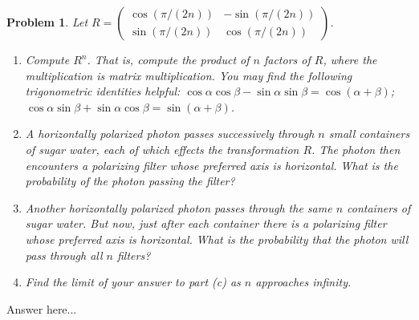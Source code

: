 \documentclass[12pt]{article}
\newenvironment{answer}
    {\begin{adjustwidth}{0pt}{0pt}}
    {\end{adjustwidth}}
\newtheorem{problem}{Problem}
\theoremstyle{remark}  %
\begin{document}
    \begin{problem}
        Let $R=\begin{pmatrix}
            \cos(\pi/(2n)) & -\sin(\pi/(2n)) \\
            \sin(\pi/(2n)) & \cos(\pi/(2n))
        \end{pmatrix}$.
        \begin{enumerate}[label=(\alph*)]
            \item Compute $R^n$. That is, compute the product of $n$ factors of $R$, where the multiplication is matrix multiplication. You may find the following trigonometric identities helpful: $\cos\alpha\cos\beta - \sin\alpha\sin\beta = \cos(\alpha + \beta)$; $\cos\alpha\sin\beta + \sin\alpha\cos\beta = \sin(\alpha + \beta)$.
            \item A horizontally polarized photon passes successively through $n$ small containers of sugar water, each of which effects the transformation $R$. The photon then encounters a polarizing filter whose preferred axis is horizontal. What is the probability of the photon passing the filter?
            \item Another horizontally polarized photon passes through the same $n$ containers of sugar water. But now, just after each container there is a polarizing filter whose preferred axis is horizontal. What is the probability that the photon will pass through all $n$ filters?
            \item Find the limit of your answer to part (c) as $n$ approaches infinity.
        \end{enumerate}
    \end{problem}
    \begin{answer}
        Answer here...
    \end{answer}
\setcounter{subsubsection}{2}
\end{document}
